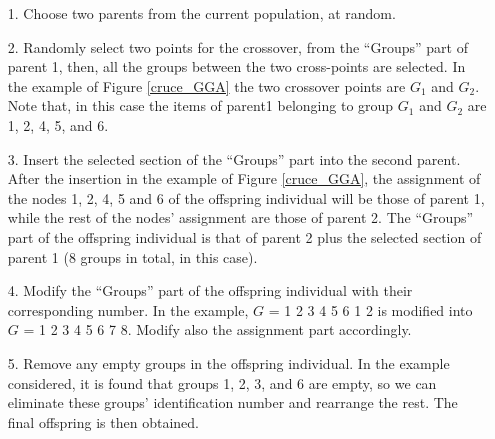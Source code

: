 \begin{itemize}
\item[1.] Choose two parents from the current population, at random.
\item[2.] Randomly select two points for the crossover, from the ``Groups'' part of parent 1, then, all the groups between the two cross-points are selected. In the example of Figure \ref{cruce_GGA} the two crossover points are $G_1$ and $G_2$. Note that, in this case the items of parent1 belonging to group $G_{1}$ and $G_{2}$ are 1, 2, 4, 5, and 6.
\item[3.] Insert the selected section of the ``Groups'' part into the second parent. After the insertion in the example of Figure \ref{cruce_GGA}, the assignment of the nodes 1, 2, 4, 5 and 6 of the offspring individual will be those of parent 1, while the rest of the nodes' assignment are those of parent 2. The ``Groups'' part of the offspring individual is that of parent 2 plus the selected section of parent 1 (8 groups in total, in this case).
\item[4.] Modify the ``Groups'' part of the offspring individual with their corresponding number. In the example, $G$ = 1 \hspace{1mm} 2 \hspace{1mm} 3 \hspace{1mm} 4 \hspace{1mm} 5 \hspace{1mm} 6 \hspace{1mm} 1 \hspace{1mm} 2 is modified into $G$ = 1 \hspace{1mm} 2 \hspace{1mm} 3 \hspace{1mm} 4 \hspace{1mm} 5 \hspace{1mm} 6 \hspace{1mm} 7 \hspace{1mm} 8. Modify also the assignment part accordingly.
\item[5.] Remove any empty groups in the offspring individual. In the example considered, it is found that groups 1, 2, 3, and 6 are empty, so we can eliminate these groups' identification number and rearrange the rest. The final offspring is then obtained.
\end{itemize}

